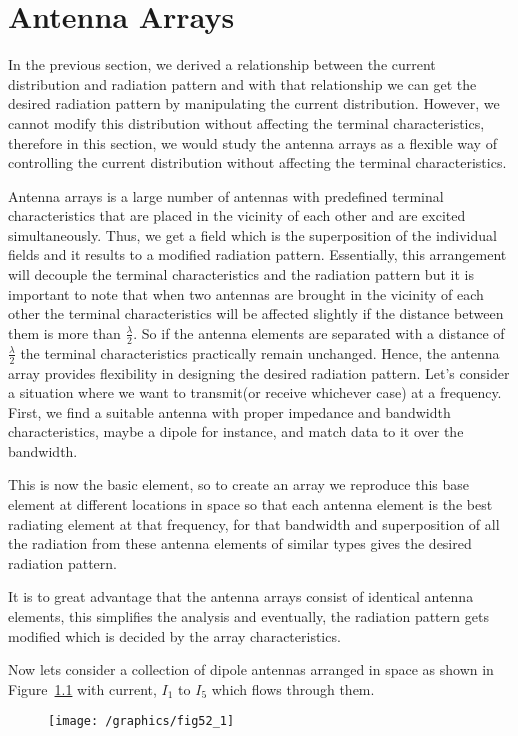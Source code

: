 \chapter{Antenna Arrays}
In the previous section, we derived a relationship between the current distribution and radiation pattern and with that relationship we can get the desired radiation pattern by manipulating the current distribution. However, we cannot modify this distribution without affecting the terminal characteristics, therefore in this section, we would study the antenna arrays as a flexible way of controlling the current distribution without affecting the terminal characteristics.

Antenna arrays is a large number of antennas with predefined terminal characteristics that are placed in the vicinity of each other and are excited simultaneously. Thus, we get a field which is the superposition of the individual fields and it results to a modified radiation pattern. Essentially, this arrangement will decouple the terminal characteristics and the radiation pattern but it is important to note that when two antennas are brought in the vicinity of each other the terminal characteristics will be affected slightly if the distance between them is more than $ \frac{\lambda}{2}$. So if the antenna elements are separated with a distance of $ \frac{\lambda}{2} $ the terminal characteristics practically remain unchanged. Hence, the antenna array provides flexibility in designing the desired radiation pattern. Let's consider a situation where we want to transmit(or receive whichever case) at a frequency. First, we find a suitable antenna with proper impedance and bandwidth characteristics, maybe a dipole for instance, and match data to it over the bandwidth.

This is now the basic element, so to create an array we reproduce this base element at different locations in space so that each antenna element is the best radiating element at that frequency, for that bandwidth and superposition of all the radiation from these antenna elements of similar types gives the desired radiation pattern.

It is to great advantage that the antenna arrays consist of identical antenna elements, this simplifies the analysis and eventually, the radiation pattern gets modified which is decided by the array characteristics.

Now lets consider a collection of dipole antennas arranged in space as shown in Figure~\ref{52.1} with current, $I_1$ to $I_5$ which flows through them.
\begin{figure}[h]
\centering
\texttt{[image: /graphics/fig52\_1]}
\caption{}
\label{52.1}
\end{figure}

